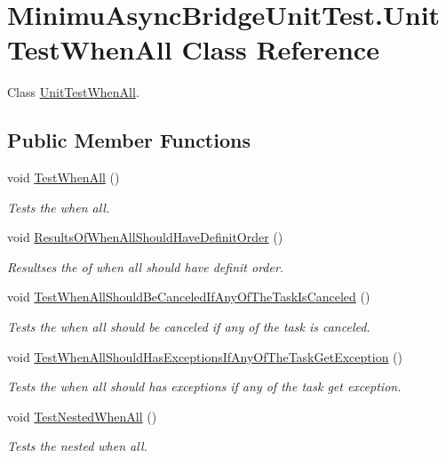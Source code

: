 \hypertarget{class_minimu_async_bridge_unit_test_1_1_unit_test_when_all}{}\section{Minimu\+Async\+Bridge\+Unit\+Test.\+Unit\+Test\+When\+All Class Reference}
\label{class_minimu_async_bridge_unit_test_1_1_unit_test_when_all}


Class \hyperlink{class_minimu_async_bridge_unit_test_1_1_unit_test_when_all}{Unit\+Test\+When\+All}.  


\subsection*{Public Member Functions}
\begin{DoxyCompactItemize}
\item 
void \hyperlink{class_minimu_async_bridge_unit_test_1_1_unit_test_when_all_ac945bbf754b871e9ebad7a51e75c5dca}{Test\+When\+All} ()
\begin{DoxyCompactList}\small\item\em Tests the when all. \end{DoxyCompactList}\item 
void \hyperlink{class_minimu_async_bridge_unit_test_1_1_unit_test_when_all_ac4159d0336a674cf4900c8679d88e4ba}{Results\+Of\+When\+All\+Should\+Have\+Definit\+Order} ()
\begin{DoxyCompactList}\small\item\em Resultses the of when all should have definit order. \end{DoxyCompactList}\item 
void \hyperlink{class_minimu_async_bridge_unit_test_1_1_unit_test_when_all_a506d4dabdc59968ee119d57b4fe2dca7}{Test\+When\+All\+Should\+Be\+Canceled\+If\+Any\+Of\+The\+Task\+Is\+Canceled} ()
\begin{DoxyCompactList}\small\item\em Tests the when all should be canceled if any of the task is canceled. \end{DoxyCompactList}\item 
void \hyperlink{class_minimu_async_bridge_unit_test_1_1_unit_test_when_all_aec076eff774e6d134c9b65ca23eb3b85}{Test\+When\+All\+Should\+Has\+Exceptions\+If\+Any\+Of\+The\+Task\+Get\+Exception} ()
\begin{DoxyCompactList}\small\item\em Tests the when all should has exceptions if any of the task get exception. \end{DoxyCompactList}\item 
void \hyperlink{class_minimu_async_bridge_unit_test_1_1_unit_test_when_all_a2c7c634aaa4c45c59e1ced410e485cff}{Test\+Nested\+When\+All} ()
\begin{DoxyCompactList}\small\item\em Tests the nested when all. \end{DoxyCompactList}\end{DoxyCompactItemize}


